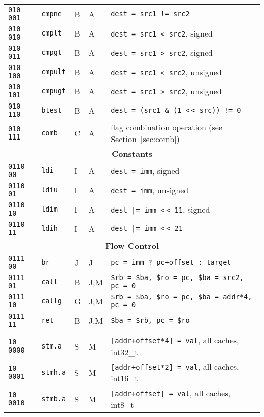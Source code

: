 \documentclass[10pt,a4paper]{article}
\newcommand{\shl}{\textless$\,\!$\textless}
\begin{document}
\begin{longtable}{llllp{}}
\texttt{010 001} & \texttt{cmpne} & B & A & \texttt{dest = src1 != src2} \\
\texttt{010 010} & \texttt{cmplt} & B & A & \texttt{dest = src1 \textless{} src2}, signed \\
\texttt{010 011} & \texttt{cmpgt} & B & A & \texttt{dest = src1 \textgreater{} src2}, signed \\
\texttt{010 100} & \texttt{cmpult} & B & A & \texttt{dest = src1 \textless{} src2}, unsigned \\
\texttt{010 101} & \texttt{cmpugt} & B & A & \texttt{dest = src1 \textgreater{} src2}, unsigned \\
\texttt{010 110} & \texttt{btest} & B & A & \texttt{dest = (src1 \& (1 \shl{} src)) != 0} \\
\texttt{010 111} & \texttt{comb} & C & A & flag combination operation (see Section~\ref{sec:comb}) \\
\midrule
\multicolumn{5}{c}{\textbf{Constants}} \\
\cmidrule{1-5}
\texttt{0110 00} & \texttt{ldi} & I & A & \texttt{dest = imm}, signed \\
\texttt{0110 01} & \texttt{ldiu} & I & A & \texttt{dest = imm}, unsigned \\
\texttt{0110 10} & \texttt{ldim} & I & A & \texttt{dest |= imm \shl{} 11}, signed \\
\texttt{0110 11} & \texttt{ldih} & I & A & \texttt{dest |= imm \shl{} 21} \\
\midrule
\multicolumn{5}{c}{\textbf{Flow Control}} \\
\cmidrule{1-5}
\texttt{0111 00} & \texttt{br} & J & J & \texttt{pc = imm ?\ pc+offset :\ target} \\
\texttt{0111 01} & \texttt{call} & B & J,M & \texttt{\$rb = \$ba, \$ro = pc, \$ba = src2, pc = 0} \\
\texttt{0111 10} & \texttt{callg} & G & J,M & \texttt{\$rb = \$ba, \$ro = pc, \$ba = addr*4, pc = 0} \\
\texttt{0111 11} & \texttt{ret} & B & J,M & \texttt{\$ba = \$rb, pc = \$ro} \\
\midrule
\pagebreak
\midrule
\multicolumn{5}{c}{\textbf{Memory Accesses}} \\
\cmidrule{1-5}
\texttt{10 0000} & \texttt{stm.a} & S & M & \texttt{[addr+offset*4] = val}, all caches, int32\_t \\
\texttt{10 0001} & \texttt{stmh.a} & S & M & \texttt{[addr+offset*2] = val}, all caches, int16\_t \\
\texttt{10 0010} & \texttt{stmb.a} & S & M & \texttt{[addr+offset] = val}, all caches, int8\_t \\

\end{longtable}
\end{document}
